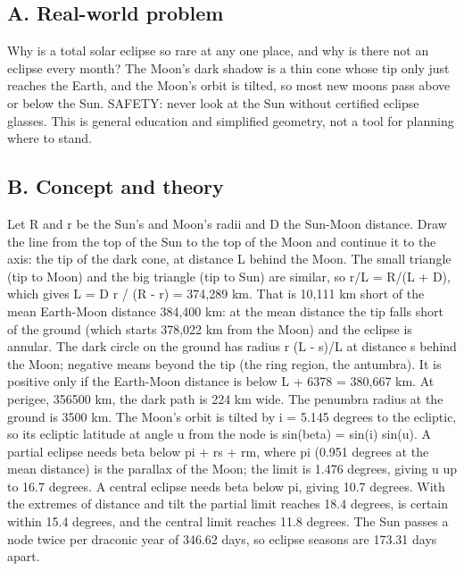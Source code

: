 \documentclass[11pt,a4paper]{article}
\begin{document}
\subsection*{A. Real-world problem}
Why is a total solar eclipse so rare at any one place, and why is there not an eclipse every month? The Moon's dark shadow is a thin cone whose tip only just reaches the Earth, and the Moon's orbit is tilted, so most new moons pass above or below the Sun. SAFETY: never look at the Sun without certified eclipse glasses. This is general education and simplified geometry, not a tool for planning where to stand.

\subsection*{B. Concept and theory}
Let R and r be the Sun's and Moon's radii and D the Sun-Moon distance. Draw the line from the top of the Sun to the top of the Moon and continue it to the axis: the tip of the dark cone, at distance L behind the Moon. The small triangle (tip to Moon) and the big triangle (tip to Sun) are similar, so r/L = R/(L + D), which gives L = D r / (R - r) = 374,289 km. That is 10,111 km short of the mean Earth-Moon distance 384,400 km: at the mean distance the tip falls short of the ground (which starts 378,022 km from the Moon) and the eclipse is annular. The dark circle on the ground has radius r (L - s)/L at distance s behind the Moon; negative means beyond the tip (the ring region, the antumbra). It is positive only if the Earth-Moon distance is below L + 6378 = 380,667 km. At perigee, 356500 km, the dark path is 224 km wide. The penumbra radius at the ground is 3500 km. The Moon's orbit is tilted by i = 5.145 degrees to the ecliptic, so its ecliptic latitude at angle u from the node is sin(beta) = sin(i) sin(u). A partial eclipse needs \textbar{}beta\textbar{} below pi + rs + rm, where pi (0.951 degrees at the mean distance) is the parallax of the Moon; the limit is 1.476 degrees, giving u up to 16.7 degrees. A central eclipse needs \textbar{}beta\textbar{} below pi, giving 10.7 degrees. With the extremes of distance and tilt the partial limit reaches 18.4 degrees, is certain within 15.4 degrees, and the central limit reaches 11.8 degrees. The Sun passes a node twice per draconic year of 346.62 days, so eclipse seasons are 173.31 days apart.
\end{document}
